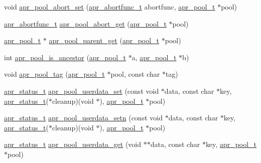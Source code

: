 \begin{DoxyCompactItemize}
void \hyperlink{group__apr__pools_gaa658b1f10dd13967eaa7c4156d4c2174}{apr\+\_\+pool\+\_\+abort\+\_\+set} (\hyperlink{group__apr__pools_ga370a939349adf6d1438068e2fc69a0dd}{apr\+\_\+abortfunc\+\_\+t} abortfunc, \hyperlink{group__apr__pools_gaf137f28edcf9a086cd6bc36c20d7cdfb}{apr\+\_\+pool\+\_\+t} $\ast$pool)
\item 
\hyperlink{group__apr__pools_ga370a939349adf6d1438068e2fc69a0dd}{apr\+\_\+abortfunc\+\_\+t} \hyperlink{group__apr__pools_gaf7610c30ef5f84a8742c0b3e63fdd7b0}{apr\+\_\+pool\+\_\+abort\+\_\+get} (\hyperlink{group__apr__pools_gaf137f28edcf9a086cd6bc36c20d7cdfb}{apr\+\_\+pool\+\_\+t} $\ast$pool)
\item 
\hyperlink{group__apr__pools_gaf137f28edcf9a086cd6bc36c20d7cdfb}{apr\+\_\+pool\+\_\+t} $\ast$ \hyperlink{group__apr__pools_ga94db31f40609b15b592ff47f989ca9ec}{apr\+\_\+pool\+\_\+parent\+\_\+get} (\hyperlink{group__apr__pools_gaf137f28edcf9a086cd6bc36c20d7cdfb}{apr\+\_\+pool\+\_\+t} $\ast$pool)
\item 
int \hyperlink{group__apr__pools_ga05d299f778659d1e0806140d8a7fea79}{apr\+\_\+pool\+\_\+is\+\_\+ancestor} (\hyperlink{group__apr__pools_gaf137f28edcf9a086cd6bc36c20d7cdfb}{apr\+\_\+pool\+\_\+t} $\ast$a, \hyperlink{group__apr__pools_gaf137f28edcf9a086cd6bc36c20d7cdfb}{apr\+\_\+pool\+\_\+t} $\ast$b)
\item 
void \hyperlink{group__apr__pools_gaeaa872f7999740a60803e95429890518}{apr\+\_\+pool\+\_\+tag} (\hyperlink{group__apr__pools_gaf137f28edcf9a086cd6bc36c20d7cdfb}{apr\+\_\+pool\+\_\+t} $\ast$pool, const char $\ast$tag)
\item 
\hyperlink{group__apr__errno_gaf76ee4543247e9fb3f3546203e590a6c}{apr\+\_\+status\+\_\+t} \hyperlink{group__apr__pools_ga78d1aa2d9fa842d83eaffccb0f0c0c5c}{apr\+\_\+pool\+\_\+userdata\+\_\+set} (const void $\ast$data, const char $\ast$key, \hyperlink{group__apr__errno_gaf76ee4543247e9fb3f3546203e590a6c}{apr\+\_\+status\+\_\+t}($\ast$cleanup)(void $\ast$), \hyperlink{group__apr__pools_gaf137f28edcf9a086cd6bc36c20d7cdfb}{apr\+\_\+pool\+\_\+t} $\ast$pool)
\item 
\hyperlink{group__apr__errno_gaf76ee4543247e9fb3f3546203e590a6c}{apr\+\_\+status\+\_\+t} \hyperlink{group__apr__pools_ga435644c493dc5b10d80c4b99b8cd4589}{apr\+\_\+pool\+\_\+userdata\+\_\+setn} (const void $\ast$data, const char $\ast$key, \hyperlink{group__apr__errno_gaf76ee4543247e9fb3f3546203e590a6c}{apr\+\_\+status\+\_\+t}($\ast$cleanup)(void $\ast$), \hyperlink{group__apr__pools_gaf137f28edcf9a086cd6bc36c20d7cdfb}{apr\+\_\+pool\+\_\+t} $\ast$pool)
\item 
\hyperlink{group__apr__errno_gaf76ee4543247e9fb3f3546203e590a6c}{apr\+\_\+status\+\_\+t} \hyperlink{group__apr__pools_gaf930f1fad2cf92a2432c0814c8a0b86f}{apr\+\_\+pool\+\_\+userdata\+\_\+get} (void $\ast$$\ast$data, const char $\ast$key, \hyperlink{group__apr__pools_gaf137f28edcf9a086cd6bc36c20d7cdfb}{apr\+\_\+pool\+\_\+t} $\ast$pool)
\end{DoxyCompactItemize}



